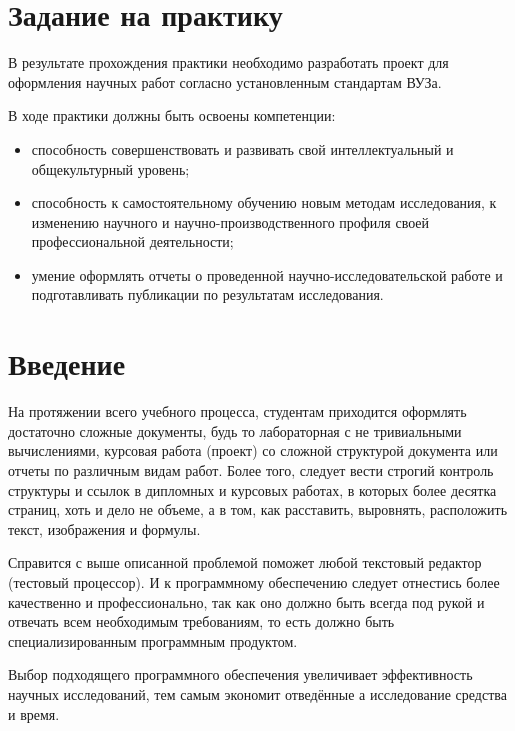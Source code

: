 \section{Задание на практику}
	В результате прохождения практики необходимо разработать проект для оформления
	научных работ согласно установленным стандартам ВУЗа\cite{norm}.

	В ходе практики должны быть освоены компетенции:
		\begin{itemize}
			\item способность совершенствовать и развивать свой интеллектуальный и общекультурный уровень;
			\item способность к самостоятельному обучению новым методам исследования, к изменению научного и научно-производственного профиля своей профессиональной деятельности;
			\item умение оформлять отчеты о проведенной научно-исследовательской работе и подготавливать публикации по результатам исследования.
		\end{itemize}

\newpage
\section{Введение}
	На протяжении всего учебного процесса, студентам приходится оформлять достаточно сложные документы,
	будь то лабораторная с не тривиальными вычислениями, курсовая работа (проект) со сложной структурой документа
	или отчеты по различным видам работ. 
	Более того, следует вести строгий контроль структуры и ссылок в дипломных и курсовых работах, в которых более десятка страниц, хоть и дело не объеме, а в том,
	как расставить, выровнять, расположить текст, изображения и формулы.

	Справится с выше описанной проблемой поможет любой текстовый редактор (тестовый процессор). И к программному обеспечению следует отнестись более качественно и профессионально,
	так как оно должно быть всегда под рукой и отвечать всем необходимым требованиям, то есть должно быть специализированным программным продуктом.

	Выбор подходящего программного обеспечения увеличивает эффективность научных исследований, тем самым экономит отведённые а исследование средства и время.
